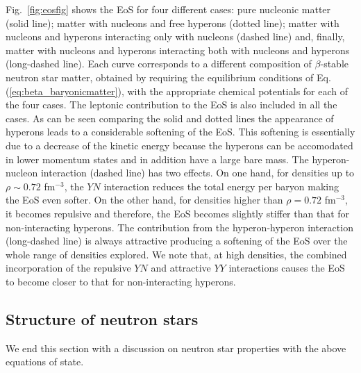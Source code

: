Fig.\ \ref{fig:eosfig} shows the EoS for four different cases:
pure nucleonic matter (solid line); matter with nucleons and
free hyperons (dotted line); matter with nucleons and hyperons
interacting only with nucleons (dashed line) and, finally, matter with nucleons and
hyperons interacting both with nucleons and hyperons (long-dashed line). Each
curve corresponds to a different composition of $\beta$-stable neutron
star matter, obtained by requiring the equilibrium conditions of
Eq. (\ref{eq:beta_baryonicmatter}), with the appropriate
chemical potentials for each of the four cases. 
The leptonic contribution to the EoS is also included in all the
cases. As can be seen comparing the solid and dotted lines the
appearance of hyperons leads to a considerable softening of the EoS.
This softening is essentially due to a decrease of the kinetic energy
because the hyperons can be accomodated in lower momentum
states and in addition have a large bare mass. The 
hyperon-nucleon interaction (dashed line) has two effects. On
one hand, for densities
up to $\rho \sim 0.72$ fm$^{-3}$, the $YN$
interaction reduces the total energy per baryon making
the EoS even softer. On the other hand, for 
densities higher than $\rho= 0.72$ fm$^{-3}$, it becomes repulsive and
therefore, the EoS becomes slightly stiffer than that for  
non-interacting hyperons. The contribution from
the hyperon-hyperon interaction (long-dashed line) is always attractive
producing a softening of the EoS over the whole range of densities explored.
We note that, at high densities, the combined
incorporation of the repulsive $YN$ and attractive $YY$ interactions 
causes the
EoS to become closer to that for 
non-interacting hyperons.



\subsection{Structure of neutron stars}
\label{sec:sec3b}

We end this section with a discussion on neutron star properties 
with the above equations of state.

